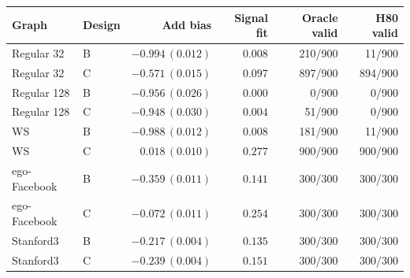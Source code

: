 \begin{tabular}{llrrrr}\toprule
Graph & Design & Add bias & Signal fit & Oracle valid & H80 valid \\ \midrule
Regular 32 & B & $-0.994\,(0.012)$ & $0.008$ & 210/900 & 11/900 \\
Regular 32 & C & $-0.571\,(0.015)$ & $0.097$ & 897/900 & 894/900 \\
Regular 128 & B & $-0.956\,(0.026)$ & $0.000$ & 0/900 & 0/900 \\
Regular 128 & C & $-0.948\,(0.030)$ & $0.004$ & 51/900 & 0/900 \\
WS & B & $-0.988\,(0.012)$ & $0.008$ & 181/900 & 11/900 \\
WS & C & $0.018\,(0.010)$ & $0.277$ & 900/900 & 900/900 \\
ego-Facebook & B & $-0.359\,(0.011)$ & $0.141$ & 300/300 & 300/300 \\
ego-Facebook & C & $-0.072\,(0.011)$ & $0.254$ & 300/300 & 300/300 \\
Stanford3 & B & $-0.217\,(0.004)$ & $0.135$ & 300/300 & 300/300 \\
Stanford3 & C & $-0.239\,(0.004)$ & $0.151$ & 300/300 & 300/300 \\
\bottomrule\end{tabular}